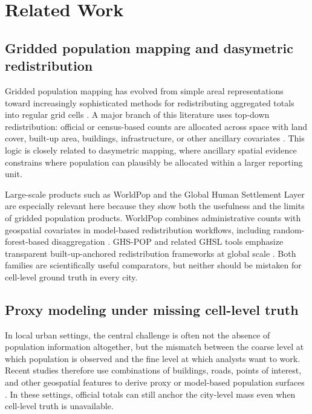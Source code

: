 \section{Related Work}

\subsection{Gridded population mapping and dasymetric redistribution}

Gridded population mapping has evolved from simple areal representations toward increasingly sophisticated methods for redistributing aggregated totals into regular grid cells \cite{Leyk2019,Mennis2009}. A major branch of this literature uses top-down redistribution: official or census-based counts are allocated across space with land cover, built-up area, buildings, infrastructure, or other ancillary covariates \cite{Mennis2009,Stevens2015}. This logic is closely related to dasymetric mapping, where ancillary spatial evidence constrains where population can plausibly be allocated within a larger reporting unit.

Large-scale products such as WorldPop and the Global Human Settlement Layer are especially relevant here because they show both the usefulness and the limits of gridded population products. WorldPop combines administrative counts with geospatial covariates in model-based redistribution workflows, including random-forest-based disaggregation \cite{Stevens2015,Sorichetta2015,Lloyd2017,WorldPopMethods}. GHS-POP and related GHSL tools emphasize transparent built-up-anchored redistribution frameworks at global scale \cite{Freire2016,GHSL2023,GHSPOP2G2020}. Both families are scientifically useful comparators, but neither should be mistaken for cell-level ground truth in every city.

\subsection{Proxy modeling under missing cell-level truth}

In local urban settings, the central challenge is often not the absence of population information altogether, but the mismatch between the coarse level at which population is observed and the fine level at which analysts want to work. Recent studies therefore use combinations of buildings, roads, points of interest, and other geospatial features to derive proxy or model-based population surfaces \cite{Qiu2020,Pirowski2024,Popcorn2024}. In these settings, official totals can still anchor the city-level mass even when cell-level truth is unavailable.

